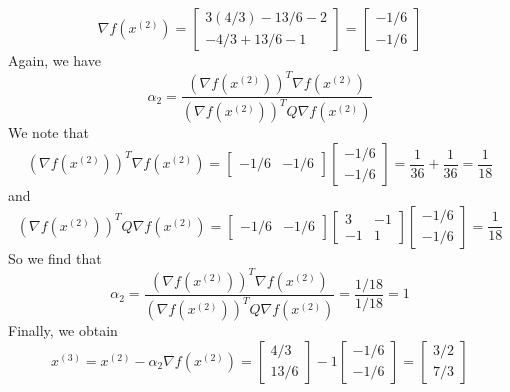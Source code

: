 \documentclass[12pt]{article}
\begin{document}
\[
\nabla f(x^{(2)}) = \begin{bmatrix}
3(4/3) - 13/6 - 2\\
-4/3 + 13/6 - 1
\end{bmatrix}
=\begin{bmatrix}
-1/6\\
-1/6
\end{bmatrix}
\] Again, we have 
\[
\alpha_2 = \frac{(\nabla f(x^{(2)}))^T \nabla f(x^{(2)})}{(\nabla f(x^{(2)}))^TQ \nabla f(x^{(2)})}
\] We note that
\[
(\nabla f(x^{(2)}))^T \nabla f(x^{(2)}) = \begin{bmatrix}
-1/6 & -1/6
\end{bmatrix} \begin{bmatrix}
-1/6\\
-1/6
\end{bmatrix} = \frac{1}{36} + \frac{1}{36} = \frac{1}{18}
\] and
\[
(\nabla f(x^{(2)}))^TQ \nabla f(x^{(2)}) = 
\begin{bmatrix}
-1/6 & -1/6
\end{bmatrix} 
\begin{bmatrix}
3 & -1\\
-1 & 1
\end{bmatrix}
\begin{bmatrix}
-1/6\\
-1/6
\end{bmatrix} = \frac{1}{18}
\] So we find that
\[
\alpha_2 = \frac{(\nabla f(x^{(2)}))^T \nabla f(x^{(2)})}{(\nabla f(x^{(2)}))^TQ \nabla f(x^{(2)})} = \frac{1/18}{1/18} = 1
\] Finally, we obtain
\[
x^{(3)} = x^{(2)} - \alpha_2 \nabla f(x^{(2)}) = 
\begin{bmatrix}
4/3\\
13/6
\end{bmatrix} - 1\begin{bmatrix}
-1/6\\
-1/6
\end{bmatrix} = 
\begin{bmatrix}
3/2\\
7/3
\end{bmatrix}
\]




\newpage
\end{document}
